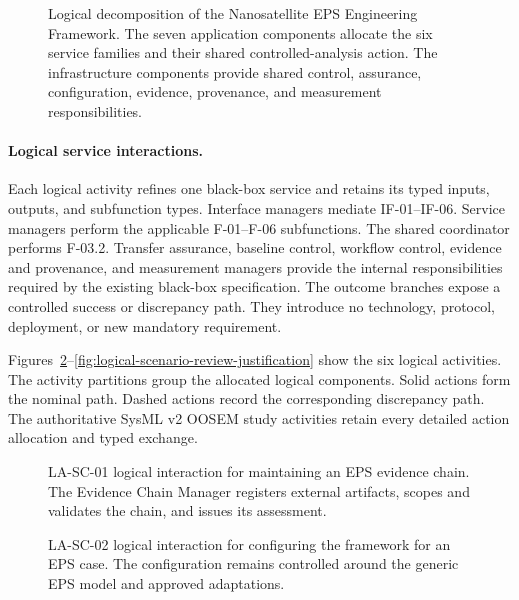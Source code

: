 \documentclass[11pt,a4paper]{article}
\begin{document}
\begin{figure}[H]
    \centering
    \resizebox{\linewidth}{!}{}
    \caption{Logical decomposition of the Nanosatellite EPS Engineering Framework. The seven application components allocate the six service families and their shared controlled-analysis action. The infrastructure components provide shared control, assurance, configuration, evidence, provenance, and measurement responsibilities.}
    \label{fig:framework-logical-decomposition}
\end{figure}

\paragraph{Logical service interactions.}
Each logical activity refines one black-box service and retains its typed inputs, outputs, and subfunction types. Interface managers mediate IF-01--IF-06. Service managers perform the applicable F-01--F-06 subfunctions. The shared coordinator performs F-03.2. Transfer assurance, baseline control, workflow control, evidence and provenance, and measurement managers provide the internal responsibilities required by the existing black-box specification. The outcome branches expose a controlled success or discrepancy path. They introduce no technology, protocol, deployment, or new mandatory requirement.

Figures~\ref{fig:logical-scenario-maintain-evidence}--\ref{fig:logical-scenario-review-justification} show the six logical activities. The activity partitions group the allocated logical components. Solid actions form the nominal path. Dashed actions record the corresponding discrepancy path. The authoritative SysML v2 OOSEM study activities retain every detailed action allocation and typed exchange.

\begin{figure}[H]
    \centering
    \resizebox{\linewidth}{!}{}
    \caption{LA-SC-01 logical interaction for maintaining an EPS evidence chain. The Evidence Chain Manager registers external artifacts, scopes and validates the chain, and issues its assessment.}
    \label{fig:logical-scenario-maintain-evidence}
\end{figure}

\begin{figure}[H]
    \centering
    \resizebox{\linewidth}{!}{}
    \caption{LA-SC-02 logical interaction for configuring the framework for an EPS case. The configuration remains controlled around the generic EPS model and approved adaptations.}
    \label{fig:logical-scenario-configure-case}
\end{figure}
\end{document}
